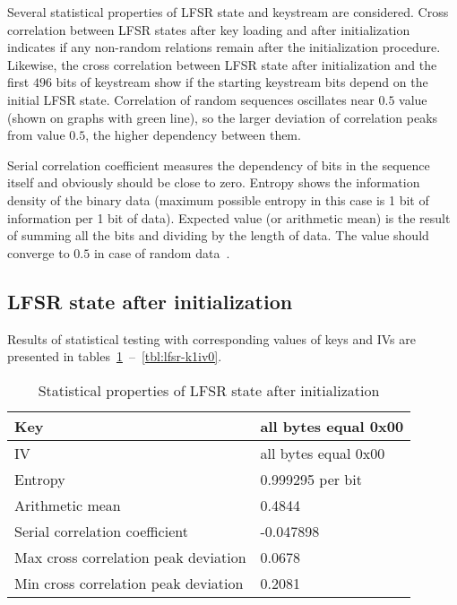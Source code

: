 Several statistical properties of LFSR state and keystream are considered.
Cross correlation between LFSR states after key loading and after
initialization indicates if any non-random relations remain after the
initialization procedure. Likewise, the cross correlation between LFSR state
after initialization and the first $496$ bits of keystream show if the starting
keystream bits depend on the initial LFSR state. Correlation of random
sequences oscillates near $0.5$ value (shown on graphs with green line), so the
larger deviation of correlation peaks from value $0.5$, the higher dependency
between them. 

Serial correlation coefficient measures the dependency of bits in the sequence
itself and obviously should be close to zero. Entropy shows the information
density of the binary data (maximum possible entropy in this case is 1 bit of
information per 1 bit of data).  Expected value (or arithmetic mean) is the
result of summing all the bits and dividing by the length of data. The value
should converge to $0.5$ in case of random data~\cite{Walker:ent}.

\subsection{LFSR state after initialization}

Results of statistical testing with corresponding values of keys and IVs are
presented in tables~\ref{tbl:lfsr-k0iv0}~--~\ref{tbl:lfsr-k1iv0}.

\begin{table}[htbp]
    \centering
    \caption{Statistical properties of LFSR state after initialization}
    \label{tbl:lfsr-k0iv0}
    \begin{tabular}{|l|l|} \hline
        Key     & all bytes equal 0x00  \\ \hline
        IV      & all bytes equal 0x00  \\ \hline 
        Entropy & 0.999295 per bit      \\ \hline 
        Arithmetic mean & 0.4844 \\ \hline 
        Serial correlation coefficient          & -0.047898 \\ \hline 
        Max cross correlation peak deviation    & 0.0678    \\ \hline
        Min cross correlation peak deviation    & 0.2081    \\ \hline
    \end{tabular}
\end{table}

